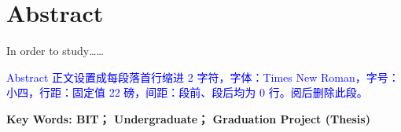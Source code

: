 \vspace*{17mm}

{\let\clearpage\relax \chapter*{
  \textmd{Abstract}\vskip -3bp}}
\setcounter{page}{2}

\setlength{\parskip}{0em}

In order to study……

\textcolor{blue}{Abstract 正文设置成每段落首行缩进 2 字符，字体：Times New Roman，字号：小四，行距：固定值 22 磅，间距：段前、段后均为 0 行。阅后删除此段。}

\vspace{3ex}\noindent\textbf{Key Words: BIT； Undergraduate； Graduation Project (Thesis)}
\newpage
